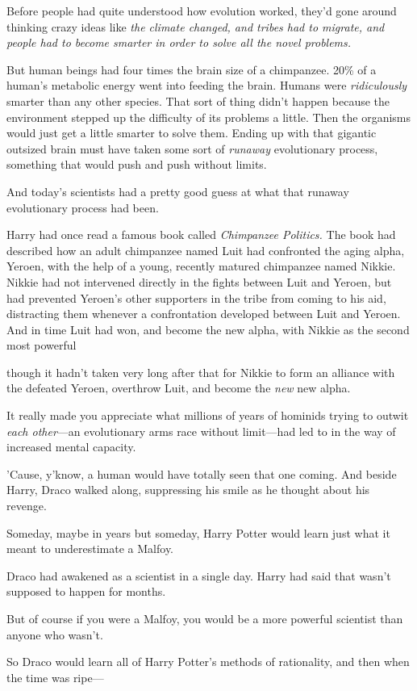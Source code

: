 Before people had quite understood how evolution worked, they'd gone around
thinking crazy ideas like \emph{the climate changed, and tribes had to migrate,
and people had to become smarter in order to solve all the novel problems.}

But human beings had four times the brain size of a chimpanzee. 20\% of a
human's metabolic energy went into feeding the brain. Humans were
\emph{ridiculously} smarter than any other species. That sort of thing didn't
happen because the environment stepped up the difficulty of its problems a
little. Then the organisms would just get a little smarter to solve them.
Ending up with that gigantic outsized brain must have taken some sort of
\emph{runaway} evolutionary process, something that would push and push without
limits.

And today's scientists had a pretty good guess at what that runaway
evolutionary process had been.

Harry had once read a famous book called \emph{Chimpanzee Politics.} The book
had described how an adult chimpanzee named Luit had confronted the aging
alpha, Yeroen, with the help of a young, recently matured chimpanzee named
Nikkie. Nikkie had not intervened directly in the fights between Luit and
Yeroen, but had prevented Yeroen's other supporters in the tribe from coming to
his aid, distracting them whenever a confrontation developed between Luit and
Yeroen. And in time Luit had won, and become the new alpha, with Nikkie as the
second most powerful{\el}

{\el} though it hadn't taken very long after that for Nikkie to form an
alliance with the defeated Yeroen, overthrow Luit, and become the \emph{new}
new alpha.

It really made you appreciate what millions of years of hominids trying to
outwit \emph{each other}---an evolutionary arms race without limit---had led to
in the way of increased mental capacity.

'Cause, y'know, a human would have totally seen that one coming.
\sbreak
And beside Harry, Draco walked along, suppressing his smile as he thought about
his revenge.

Someday, maybe in years but someday, Harry Potter would learn just what it
meant to underestimate a Malfoy.

Draco had awakened as a scientist in a single day. Harry had said that wasn't
supposed to happen for months.

But of course if you were a Malfoy, you would be a more powerful scientist than
anyone who wasn't.

So Draco would learn all of Harry Potter's methods of rationality, and then
when the time was ripe---
